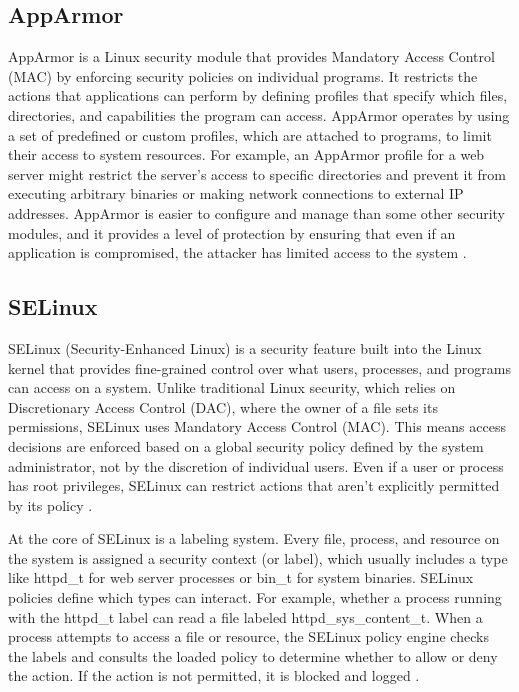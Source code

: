 \begin{doublespace}
\subsection{AppArmor}
AppArmor is a Linux security module that provides Mandatory Access Control (MAC) by enforcing security policies on individual programs. It restricts the actions that applications can perform by defining profiles that specify which files, directories, and capabilities the program can access. AppArmor operates by using a set of predefined or custom profiles, which are attached to programs, to limit their access to system resources. For example, an AppArmor profile for a web server might restrict the server's access to specific directories and prevent it from executing arbitrary binaries or making network connections to external IP addresses. AppArmor is easier to configure and manage than some other security modules, and it provides a level of protection by ensuring that even if an application is compromised, the attacker has limited access to the system \cite{archwiki_apparmor}.

\subsection{SELinux}
SELinux (Security-Enhanced Linux) is a security feature built into the Linux kernel that provides fine-grained control over what users, processes, and programs can access on a system. Unlike traditional Linux security, which relies on Discretionary Access Control (DAC), where the owner of a file sets its permissions, SELinux uses Mandatory Access Control (MAC). This means access decisions are enforced based on a global security policy defined by the system administrator, not by the discretion of individual users. Even if a user or process has root privileges, SELinux can restrict actions that aren't explicitly permitted by its policy \cite{redhat2007selinuxguide}.

At the core of SELinux is a labeling system. Every file, process, and resource on the system is assigned a security context (or label), which usually includes a type like httpd_t for web server processes or bin_t for system binaries. SELinux policies define which types can interact. For example, whether a process running with the httpd_t label can read a file labeled httpd_sys_content_t. When a process attempts to access a file or resource, the SELinux policy engine checks the labels and consults the loaded policy to determine whether to allow or deny the action. If the action is not permitted, it is blocked and logged \cite{redhat2007selinuxguide}.


\end{doublespace}
